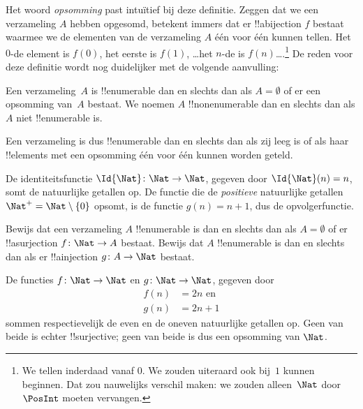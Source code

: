 \documentclass[openany]{memoir}
\begin{document}
\begin{explain}
Het woord \emph{opsomming} past intuïtief bij deze definitie. Zeggen
dat we een verzameling $A$ hebben opgesomd, betekent immers dat er
!!a{bijection} $f$ bestaat waarmee we de elementen van de verzameling
$A$ één voor één kunnen tellen. Het $0$-de element is $f(0)$, het
eerste is $f(1)$, \ldots het $n$-de is $f(n)$\ldots.\footnote{We
tellen inderdaad vanaf $0$. We zouden uiteraard ook bij~$1$ kunnen
beginnen. Dat zou nauwelijks verschil maken: we zouden alleen~$\Nat$
door~$\PosInt$ moeten vervangen.} De reden voor deze definitie wordt
nog duidelijker met de volgende aanvulling:
\end{explain}

\begin{defn}
  Een verzameling~$A$ is !!{enumerable} dan en slechts dan als $A =
  \emptyset$ of er een opsomming van~$A$ bestaat. We noemen $A$
  !!{nonenumerable} dan en slechts dan als $A$ niet !!{enumerable} is.
\end{defn}

\begin{explain}
Een verzameling is dus !!{enumerable} dan en slechts dan als zij leeg
is of als haar !!{element}s met een opsomming één voor één kunnen
worden geteld.
\end{explain}

\begin{ex}
De identiteitsfunctie $\Id{\Nat} \colon \Nat \to \Nat$, gegeven door
$\Id{\Nat}(n) = n$, somt de natuurlijke getallen op. De functie die de
\emph{positieve} natuurlijke getallen $\Nat^+ = \Nat \setminus
\{0\}$ opsomt, is de functie $g(n) = n + 1$, dus de opvolgerfunctie.
\end{ex}

\begin{prob}
Bewijs dat een verzameling $A$ !!{enumerable} is dan en slechts dan
als $A = \emptyset$ of er !!a{surjection} $f\colon \Nat \to A$
bestaat. Bewijs dat $A$ !!{enumerable} is dan en slechts dan als er
!!a{injection} $g\colon A \to \Nat$ bestaat.
\end{prob}

\begin{ex}
De functies $f\colon \Nat \to \Nat$ en $g \colon \Nat \to \Nat$,
gegeven door
\begin{align*}
  f(n) & = 2n \text{ en}\\
  g(n) & = 2n+1
\end{align*}
sommen respectievelijk de even en de oneven natuurlijke getallen op.
Geen van beide is echter !!{surjective}; geen van beide is dus een
opsomming van $\Nat$.
\end{ex}
\end{document}
